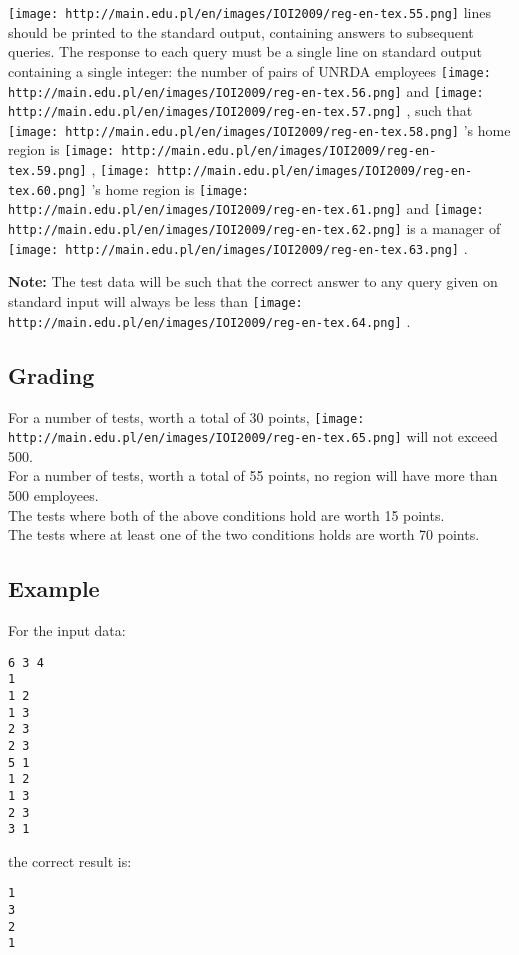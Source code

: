 \texttt{[image: http://main.edu.pl/en/images/IOI2009/reg-en-tex.55.png]}   lines should be printed to the standard output, containing answers to  subsequent queries.   The response to each query must be a single line  on standard output containing a single integer: the number of pairs of  UNRDA employees   
\texttt{[image: http://main.edu.pl/en/images/IOI2009/reg-en-tex.56.png]}   and   
\texttt{[image: http://main.edu.pl/en/images/IOI2009/reg-en-tex.57.png]}   , such that   
\texttt{[image: http://main.edu.pl/en/images/IOI2009/reg-en-tex.58.png]}   's home region is   
\texttt{[image: http://main.edu.pl/en/images/IOI2009/reg-en-tex.59.png]}   ,   
\texttt{[image: http://main.edu.pl/en/images/IOI2009/reg-en-tex.60.png]}   's home region is   
\texttt{[image: http://main.edu.pl/en/images/IOI2009/reg-en-tex.61.png]}   and   
\texttt{[image: http://main.edu.pl/en/images/IOI2009/reg-en-tex.62.png]}   is a manager of   
\texttt{[image: http://main.edu.pl/en/images/IOI2009/reg-en-tex.63.png]}   .  

\textbf{    Note:   }   The test data will be such that the correct answer to any query given on standard input will always be less than   
\texttt{[image: http://main.edu.pl/en/images/IOI2009/reg-en-tex.64.png]}   .  

\subsection{   Grading  }

   For a number of tests, worth a total of 30 points,   
\texttt{[image: http://main.edu.pl/en/images/IOI2009/reg-en-tex.65.png]}   will not exceed 500.   
\\   For a number of tests, worth a total of 55 points, no region will have more than 500 employees.   
\\   The tests where both of the above conditions hold are worth 15 points.   
\\   The tests where at least one of the two conditions holds are worth 70 points.  

\subsection{   Example  }

   For the input data:  
\begin{verbatim}
6 3 4
1
1 2
1 3
2 3
2 3
5 1
1 2
1 3
2 3
3 1
\end{verbatim}

   the correct result is:  
\begin{verbatim}
1
3
2
1
\end{verbatim}